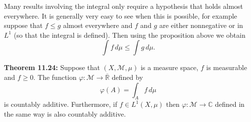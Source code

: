 \documentclass[12pt]{book}
\newcommand{\C}{{\mathbb{C}}}
\newcommand{\R}{{\mathbb{R}}}
\newcommand{\sM}{{\mathcal{M}}}
\theoremstyle{plain}
\theoremstyle{remark}
\theoremstyle{definition}
\theoremstyle{exercise}
\theoremstyle{example}
\begin{document}
Many results involving the integral only require a hypothesis that holds
almost everywhere.  It is generally very easy to see when this is possible,
for example suppose that
$f \leq g$ almost everywhere and $f$ and $g$
are either nonnegative or in $L^1$ (so that the integral is defined).  Then
using the proposition above we obtain
$$
\int f \, d\mu \leq \int g \, d\mu .
$$

\medskip

\textbf{Theorem 11.24:}
Suppose that $(X,\sM,\mu)$ is a measure space, $f$ is measurable and
$f \geq 0$.
The function $\varphi \colon \sM \to \overline{\R}$ defined by
$$
\varphi(A) = \int_A f\, d\mu
$$
is countably additive.
Furthermore, if $f \in L^1(X,\mu)$ then 
$\varphi \colon \sM \to \C$ defined in the same way is also countably
additive.

\medskip
\end{document}
